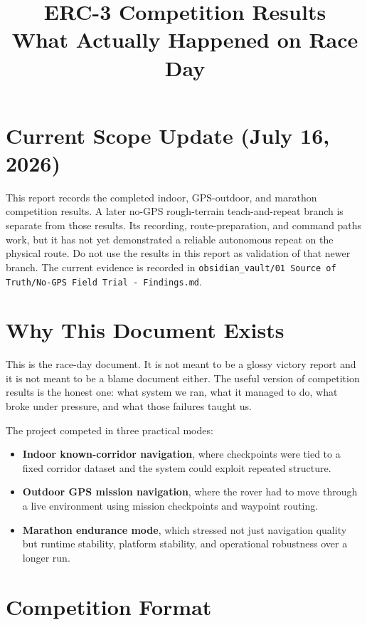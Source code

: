 \documentclass[11pt]{article}
\title{ERC-3 Competition Results\\
\large What Actually Happened on Race Day}
\author{}
\date{}
\begin{document}
\maketitle

\section*{Current Scope Update (July 16, 2026)}
This report records the completed indoor, GPS-outdoor, and marathon competition
results. A later no-GPS rough-terrain teach-and-repeat branch is separate from
those results. Its recording, route-preparation, and command paths work, but it
has not yet demonstrated a reliable autonomous repeat on the physical route.
Do not use the results in this report as validation of that newer branch. The
current evidence is recorded in
\texttt{obsidian\_vault/01 Source of Truth/No-GPS Field Trial - Findings.md}.

\section{Why This Document Exists}

This is the race-day document. It is not meant to be a glossy victory report and
it is not meant to be a blame document either. The useful version of competition
results is the honest one: what system we ran, what it managed to do, what broke
under pressure, and what those failures taught us.

The project competed in three practical modes:

\begin{itemize}[nosep]
  \item \textbf{Indoor known-corridor navigation}, where checkpoints were tied to a
  fixed corridor dataset and the system could exploit repeated structure.
  \item \textbf{Outdoor GPS mission navigation}, where the rover had to move through
  a live environment using mission checkpoints and waypoint routing.
  \item \textbf{Marathon endurance mode}, which stressed not just navigation quality
  but runtime stability, platform stability, and operational robustness over a
  longer run.
\end{itemize}

\section{Competition Format}
\end{document}
